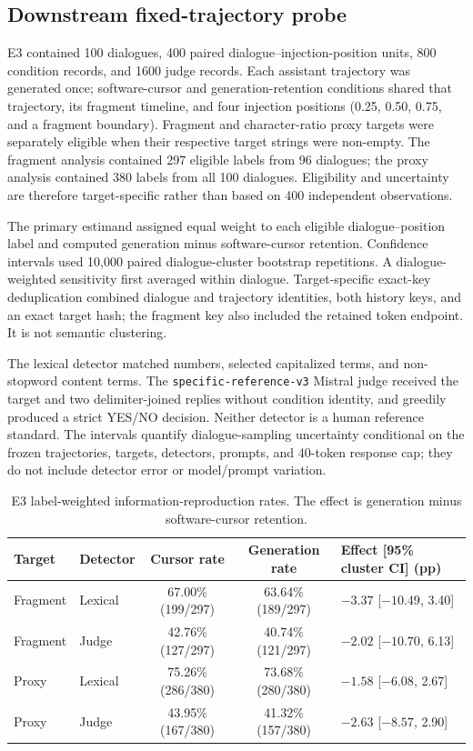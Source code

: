 \subsection{Downstream fixed-trajectory probe}

E3 contained 100 dialogues, 400 paired dialogue--injection-position units, 800 condition records, and 1600 judge records. Each assistant trajectory was generated once; software-cursor and generation-retention conditions shared that trajectory, its fragment timeline, and four injection positions (0.25, 0.50, 0.75, and a fragment boundary). Fragment and character-ratio proxy targets were separately eligible when their respective target strings were non-empty. The fragment analysis contained 297 eligible labels from 96 dialogues; the proxy analysis contained 380 labels from all 100 dialogues. Eligibility and uncertainty are therefore target-specific rather than based on 400 independent observations.

The primary estimand assigned equal weight to each eligible dialogue--position label and computed generation minus software-cursor retention. Confidence intervals used 10,000 paired dialogue-cluster bootstrap repetitions. A dialogue-weighted sensitivity first averaged within dialogue. Target-specific exact-key deduplication combined dialogue and trajectory identities, both history keys, and an exact target hash; the fragment key also included the retained token endpoint. It is not semantic clustering.

The lexical detector matched numbers, selected capitalized terms, and non-stopword content terms. The \texttt{specific-reference-v3} Mistral judge received the target and two delimiter-joined replies without condition identity, and greedily produced a strict YES/NO decision. Neither detector is a human reference standard. The intervals quantify dialogue-sampling uncertainty conditional on the frozen trajectories, targets, detectors, prompts, and 40-token response cap; they do not include detector error or model/prompt variation.

\begin{table}[t]
\centering
\small
\caption{E3 label-weighted information-reproduction rates. The effect is generation minus software-cursor retention.}
\label{tab:e3}
\begin{tabularx}{\linewidth}{@{}llccY@{}}
\toprule
Target & Detector & Cursor rate & Generation rate & Effect [95\% cluster CI] (pp) \\
\midrule
Fragment & Lexical & 67.00\% (199/297) & 63.64\% (189/297) & $-3.37$ [$-10.49$, 3.40] \\
Fragment & Judge & 42.76\% (127/297) & 40.74\% (121/297) & $-2.02$ [$-10.70$, 6.13] \\
Proxy & Lexical & 75.26\% (286/380) & 73.68\% (280/380) & $-1.58$ [$-6.08$, 2.67] \\
Proxy & Judge & 43.95\% (167/380) & 41.32\% (157/380) & $-2.63$ [$-8.57$, 2.90] \\
\bottomrule
\end{tabularx}
\end{table}

